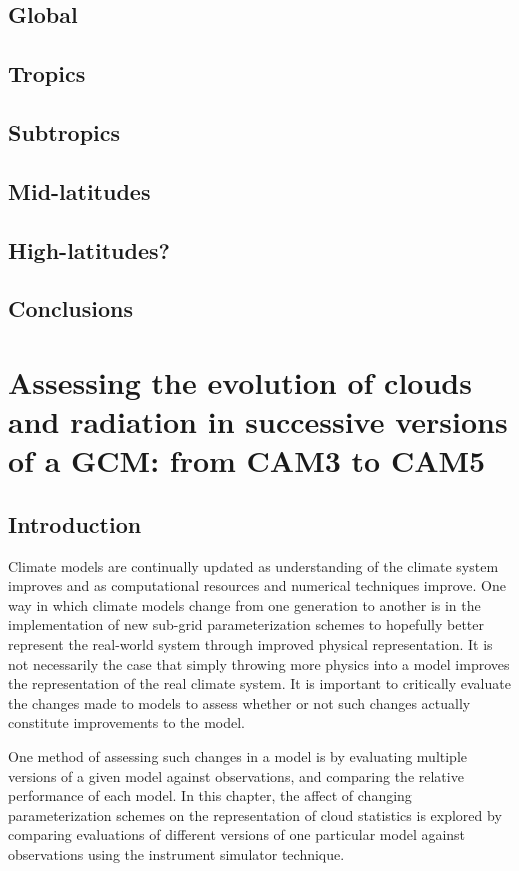 \section{Global}
\section{Tropics}
\section{Subtropics}
\section{Mid-latitudes}
\section{High-latitudes?}
\section{Conclusions}

\chapter{Assessing the evolution of clouds and radiation in successive versions of a GCM: from CAM3 to CAM5}
\section{Introduction}
Climate models are continually updated as understanding of the climate system improves and as computational resources and numerical techniques improve. One way in which climate models change from one generation to another is in the implementation of new sub-grid parameterization schemes to hopefully better represent the real-world system through improved physical representation. It is not necessarily the case that simply throwing more physics into a model improves the representation of the real climate system. It is important to critically evaluate the changes made to models to assess whether or not such changes actually constitute improvements to the model.

One method of assessing such changes in a model is by evaluating multiple versions of a given model against observations, and comparing the relative performance of each model. In this chapter, the affect of changing parameterization schemes on the representation of cloud statistics is explored by comparing evaluations of different versions of one particular model against observations using the instrument simulator technique.

